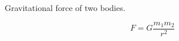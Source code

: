 \documentclass{article}
\begin{document}
Gravitational force of two bodies.

\begin{displaymath}
    F = G \frac{m_1m_2}{r^2}
\end{displaymath}
\end{document}
